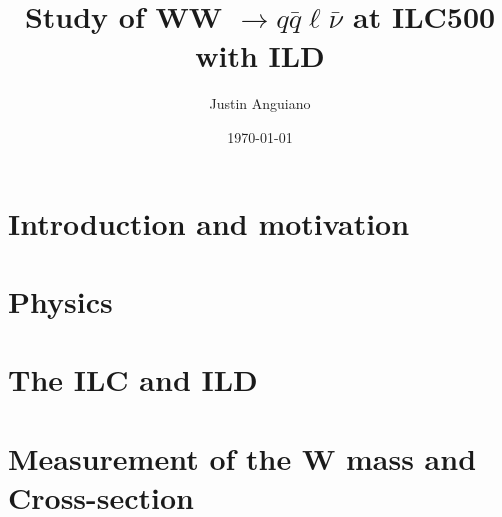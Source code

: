 \documentclass[%
 amsmath,amssymb,
 aps,
 prc
]{revtex4-1}
\begin{document}
\title{Study of WW $\rightarrow q\bar{q}\ell\bar{\nu}$ at ILC500 with ILD }
\author{Justin Anguiano}
\date{\today}


\begin{abstract}

\end{abstract}


\maketitle


\section{Introduction and motivation}
\label{sec:Introduction}
%

\section{Physics}
\label{sec:physics}





\section{The ILC and ILD}
\label{sec:ILC_detector}



\section{Measurement of the W mass and Cross-section}
\label{Current_Work} 

\end{document}
